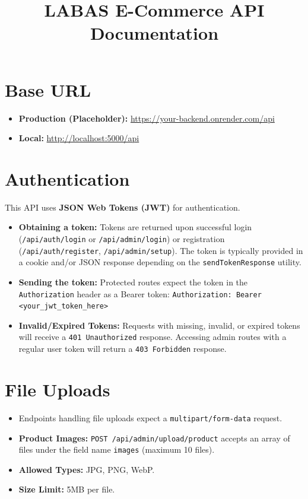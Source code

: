 \documentclass[12pt,a4paper]{article}
\title{LABAS E-Commerce API Documentation}
\author{}
\date{}
\begin{document}
\maketitle
\tableofcontents
\newpage

\section{Base URL}
\begin{itemize}
    \item \textbf{Production (Placeholder):} \url{https://your-backend.onrender.com/api}
    \item \textbf{Local:} \url{http://localhost:5000/api}
\end{itemize}

\section{Authentication}
This API uses \textbf{JSON Web Tokens (JWT)} for authentication.
\begin{itemize}
    \item \textbf{Obtaining a token:} Tokens are returned upon successful login (\texttt{/api/auth/login} or \texttt{/api/admin/login}) or registration (\texttt{/api/auth/register}, \texttt{/api/admin/setup}). The token is typically provided in a cookie and/or JSON response depending on the \texttt{sendTokenResponse} utility.
    \item \textbf{Sending the token:} Protected routes expect the token in the \texttt{Authorization} header as a Bearer token: 
    \texttt{Authorization: Bearer <your\_jwt\_token\_here>}
    \item \textbf{Invalid/Expired Tokens:} Requests with missing, invalid, or expired tokens will receive a \texttt{401 Unauthorized} response. Accessing admin routes with a regular user token will return a \texttt{403 Forbidden} response.
\end{itemize}

\section{File Uploads}
\begin{itemize}
    \item Endpoints handling file uploads expect a \texttt{multipart/form-data} request.
    \item \textbf{Product Images:} \texttt{POST /api/admin/upload/product} accepts an array of files under the field name \texttt{images} (maximum 10 files).
    \item \textbf{Allowed Types:} JPG, PNG, WebP.
    \item \textbf{Size Limit:} 5MB per file.
\end{itemize}
\end{document}
